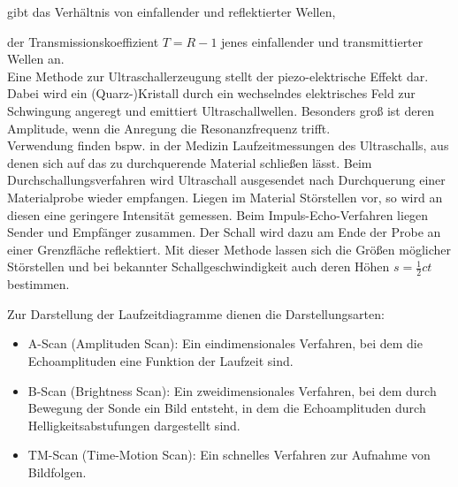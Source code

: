 gibt das Verhältnis von einfallender und reflektierter Wellen,

der Transmissionskoeffizient $T = R - 1$
jenes einfallender und transmittierter Wellen an. \\

Eine Methode zur Ultraschallerzeugung stellt der
piezo-elektrische Effekt dar. Dabei wird ein
(Quarz-)Kristall durch ein wechselndes
elektrisches Feld zur Schwingung angeregt und
emittiert Ultraschallwellen. Besonders groß
ist deren Amplitude, wenn die Anregung die 
Resonanzfrequenz trifft. \\

Verwendung finden bspw. in der Medizin Laufzeitmessungen des Ultraschalls,
aus denen sich auf das zu durchquerende Material schließen lässt.
Beim Durchschallungsverfahren wird Ultraschall ausgesendet nach
Durchquerung einer Materialprobe wieder empfangen.
Liegen im Material Störstellen vor, so wird an diesen
eine geringere Intensität gemessen.
Beim Impuls-Echo-Verfahren liegen Sender und
Empfänger zusammen. Der Schall wird dazu am Ende der Probe
an einer Grenzfläche reflektiert. Mit dieser Methode 
lassen sich die Größen möglicher Störstellen  und bei bekannter
Schallgeschwindigkeit auch deren Höhen $s = \frac{1}{2} c t$ bestimmen.

Zur Darstellung der Laufzeitdiagramme dienen die Darstellungsarten:

\begin{itemize}
    \item A-Scan (Amplituden Scan): Ein eindimensionales Verfahren, bei dem die 
    Echoamplituden eine Funktion der Laufzeit sind.
    \item B-Scan (Brightness Scan): Ein zweidimensionales Verfahren, bei dem
    durch Bewegung der Sonde ein Bild entsteht, in dem
    die Echoamplituden durch Helligkeitsabstufungen dargestellt sind. 
    \item TM-Scan (Time-Motion Scan): Ein schnelles Verfahren zur Aufnahme
    von Bildfolgen.
\end{itemize}










